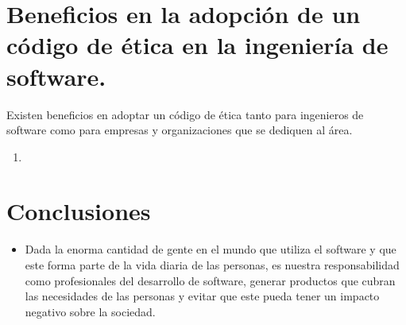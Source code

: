 \documentclass[twoside]{article}
\begin{document}
\begin{multicols}{2}
\section{Beneficios en la adopción de un código de ética en la ingeniería de software.}

Existen beneficios en adoptar un código de ética tanto para ingenieros de
software como para empresas y organizaciones que se dediquen al área.

\begin{enumerate}
    \item 
\end{enumerate}

\section{Conclusiones}

\begin{itemize}
\item Dada la enorma cantidad de gente en el mundo que utiliza el software y
que este forma parte de la vida diaria de las personas, es nuestra
responsabilidad como profesionales del desarrollo de software, generar productos
que cubran las necesidades de las personas y evitar que este pueda tener un
impacto negativo sobre la sociedad.

\end{itemize}


\pagebreak
 


\end{multicols}
\end{document}
